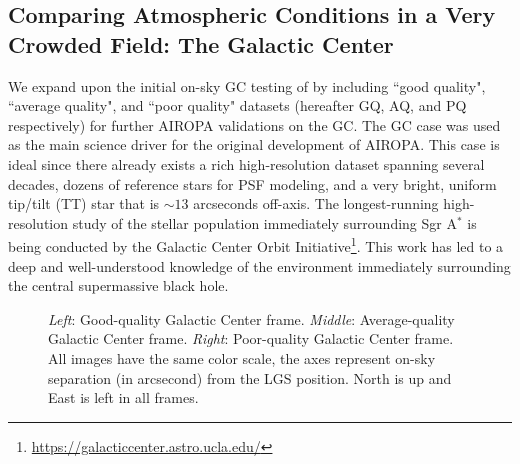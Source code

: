 \documentclass[]{spie}  %
\begin{document}
\subsection{Comparing Atmospheric Conditions in a Very Crowded Field: The Galactic Center} \label{sec:gc-data}
We expand upon the initial on-sky GC testing of \cite{Turri:inprep} by including ``good quality", ``average quality", and ``poor quality" datasets (hereafter GQ, AQ, and PQ respectively) for further AIROPA validations on the GC. The GC case was used as the main science driver for the original development of AIROPA. This case is ideal since there already exists a rich high-resolution dataset spanning several decades, dozens of reference stars for PSF modeling, and a very bright, uniform tip/tilt (TT) star that is ${\sim}13$ arcseconds off-axis. The longest-running high-resolution study of the stellar population immediately surrounding Sgr A$^{*}$ is being conducted by the Galactic Center Orbit Initiative\footnote[1]{\url{https://galacticcenter.astro.ucla.edu/}}.
This work has led to a deep and well-understood knowledge \cite{ghez:2005b, ghez:2008a, lu:2008a, do:2019a, gautam:2019a} of the environment immediately surrounding the central supermassive black hole.

\begin{figure}[!h]
 \caption{\footnotesize \textit{Left}: Good-quality Galactic Center frame. \textit{Middle}: Average-quality Galactic Center frame. \textit{Right}: Poor-quality Galactic Center frame. All images have the same color scale, the axes represent on-sky separation (in arcsecond) from the LGS position. North is up and East is left in all frames. \label{fig:gc_images}}
\end{figure}
\end{document}
